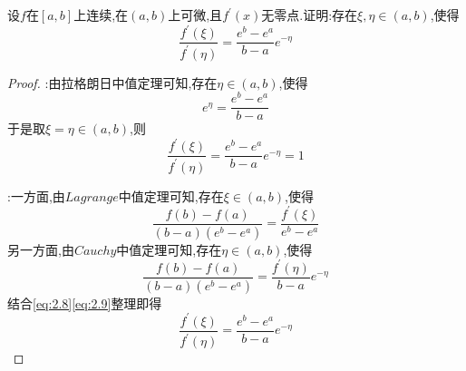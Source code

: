 \documentclass[lang=cn,newtx,10pt,scheme=chinese]{../Template/elegantbook}
\begin{document}
\begin{exercise}
    设\(f\)在\([a,b]\)上连续,在\((a,b)\)上可微,且\(f^{\prime}(x)\)无零点.证明:存在\(\xi,\eta\in(a,b)\),使得
    \begin{equation}
        \frac{f^{\prime}(\xi)}{f^{\prime}(\eta)}=\frac{e^{b}-e^{a}}{b - a}e^{-\eta}
    \nonumber
    \end{equation}
    \begin{proof}
        {\color{blue} }:由拉格朗日中值定理可知,存在$\eta\in(a,b)$,使得
    \begin{equation}
        e^{\eta}=\frac{e^b-e^a}{b-a}
        \nonumber
    \end{equation}
    于是取$\xi=\eta\in(a,b)$,则
    \begin{equation}
        \frac{f^{\prime}(\xi )}{f^{\prime}(\eta )}=\frac{e^b-e^a}{b-a}e^{-\eta}=1
        \nonumber
    \end{equation}

    {\color{blue} }:一方面,由$Lagrange$中值定理可知,存在$\xi \in(a,b)$,使得
    \begin{equation}\label{eq:2.8}
        \frac{f(b)-f\left( a \right)}{\left( b-a \right) \left( e^b-e^a \right)}=\frac{f^{\prime}(\xi )}{e^b-e^a}
    \end{equation}
    另一方面,由$Cauchy$中值定理可知,存在$\eta \in(a,b)$,使得
    \begin{equation}\label{eq:2.9}
        \frac{f(b)-f\left( a \right)}{\left( b-a \right) \left( e^b-e^a \right)}=\frac{f^{\prime}(\eta )}{b-a}e^{-\eta}
    \end{equation}
    结合\eqref{eq:2.8}\eqref{eq:2.9}整理即得
    \begin{equation}
        \frac{f^{\prime}(\xi )}{f^{\prime}(\eta )}=\frac{e^b-e^a}{b-a}e^{-\eta}
    \end{equation}
    
\end{proof}
\end{exercise}
\end{document}
